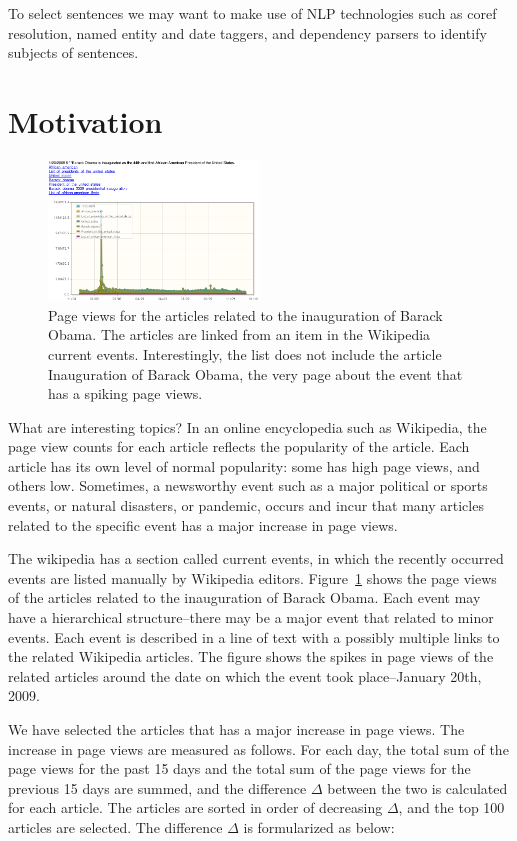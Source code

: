 \documentclass[11pt]{article}
\newcommand{\war}[1]{{\sf\small #1}}
\begin{document}
To select sentences we may want to make use of NLP technologies such as coref resolution, named entity and date taggers, and dependency parsers to identify subjects of sentences.

\section{Motivation}

\begin{figure}
\centering
\includegraphics[width=0.5\textwidth]{figures/obama_sparkline.png}
\caption{Page views for the articles related to the inauguration of Barack Obama. The articles are linked from an item in the Wikipedia current events. Interestingly, the list does not include the article \war{Inauguration of Barack Obama}, the very page about the event that has a spiking page views.}
\label{fig:obama-sparkline}
\end{figure}

What are interesting topics? In an online encyclopedia such as Wikipedia, the page view counts for each article reflects the popularity of the article. Each article has its own level of normal popularity: some has high page views, and others low. Sometimes, a newsworthy event such as a major political or sports events, or natural disasters, or pandemic, occurs and incur that many articles related to the specific event has a major increase in page views.

The wikipedia has a section called current events, in which the recently occurred events are listed manually by Wikipedia editors. Figure~\ref{fig:obama-sparkline} shows the page views of the articles related to the inauguration of Barack Obama. Each event may have a hierarchical structure--there may be a major event that related to minor events. Each event is described in a line of text with a possibly multiple links to the related Wikipedia articles. The figure shows the spikes in page views of the related articles around the date on which the event took place--January 20th, 2009.

We have selected the articles that has a major increase in page views. The increase in page views are measured as follows. For each day, the total sum of the page views for the past 15 days and the total sum of the page views for the previous 15 days are summed, and the difference $\Delta$ between the two is calculated for each article. The articles are sorted in order of decreasing $\Delta$, and the top 100 articles are selected. The difference $\Delta$ is formularized as below:
\end{document}
